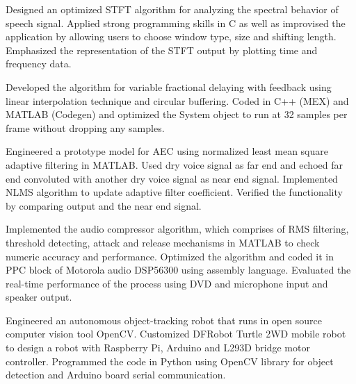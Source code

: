 \documentclass[]{deedy-resume-openfont}
\begin{document}
\begin{minipage}[t]{0.73\textwidth}
\sectionsep
\sectionsep

 
Designed an optimized STFT algorithm for analyzing the spectral behavior of speech signal. Applied strong programming skills in C as well as improvised the application by allowing users to choose window type, size and shifting length. Emphasized the representation of the STFT output by plotting time and frequency data.

\sectionsep
\sectionsep

 
Developed the algorithm for variable fractional delaying with feedback using linear interpolation technique and circular buffering. Coded in C++ (MEX) and MATLAB (Codegen) and optimized the System object to run at 32 samples per frame without dropping any samples.

\sectionsep
\sectionsep

 
Engineered a prototype model for AEC using normalized least mean square adaptive filtering in MATLAB. Used dry voice signal as far end and echoed far end convoluted with another dry voice signal as near end signal. Implemented NLMS algorithm to update adaptive filter coefficient. Verified the functionality by comparing output and the near end signal.

\sectionsep
\sectionsep

 

Implemented the audio compressor algorithm, which comprises of RMS filtering, threshold detecting, attack and release mechanisms in MATLAB to check numeric accuracy and performance. Optimized the algorithm and coded it in PPC block of Motorola audio DSP56300 using assembly language. Evaluated the real-time performance of the process using DVD and microphone input and speaker output.

\sectionsep
\sectionsep

 
Engineered an autonomous object-tracking robot that runs in open source computer vision tool OpenCV. Customized DFRobot Turtle 2WD mobile robot to design a robot with Raspberry Pi, Arduino and L293D bridge motor controller. Programmed the code in Python using OpenCV library for object detection and Arduino board serial communication. 

\sectionsep
\sectionsep

\end{minipage} 
\end{document}
